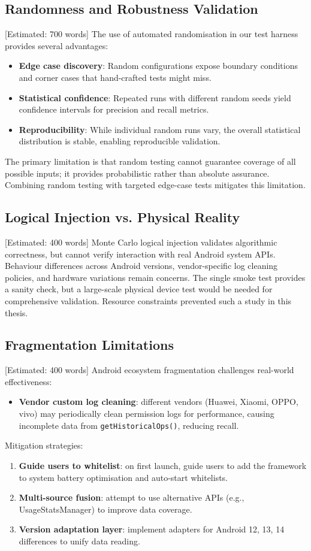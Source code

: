 \subsection{Randomness and Robustness Validation} [Estimated: 700 words]
The use of automated randomisation in our test harness provides several advantages:
\begin{itemize}
\item \textbf{Edge case discovery}: Random configurations expose boundary conditions and corner cases that hand-crafted tests might miss.
\item \textbf{Statistical confidence}: Repeated runs with different random seeds yield confidence intervals for precision and recall metrics.
\item \textbf{Reproducibility}: While individual random runs vary, the overall statistical distribution is stable, enabling reproducible validation.
\end{itemize}

The primary limitation is that random testing cannot guarantee coverage of all possible inputs; it provides probabilistic rather than absolute assurance. Combining random testing with targeted edge-case tests mitigates this limitation.

\subsection{Logical Injection vs. Physical Reality} [Estimated: 400 words]
Monte Carlo logical injection validates algorithmic correctness, but cannot verify interaction with real Android system APIs. Behaviour differences across Android versions, vendor-specific log cleaning policies, and hardware variations remain concerns. The single smoke test provides a sanity check, but a large-scale physical device test would be needed for comprehensive validation. Resource constraints prevented such a study in this thesis.

\subsection{Fragmentation Limitations} [Estimated: 400 words]
Android ecosystem fragmentation challenges real-world effectiveness:
\begin{itemize}
\item \textbf{Vendor custom log cleaning}: different vendors (Huawei, Xiaomi, OPPO, vivo) may periodically clean permission logs for performance, causing incomplete data from \texttt{getHistoricalOps()}, reducing recall.
\end{itemize}

Mitigation strategies:
\begin{enumerate}
\item \textbf{Guide users to whitelist}: on first launch, guide users to add the framework to system battery optimisation and auto-start whitelists.
\item \textbf{Multi-source fusion}: attempt to use alternative APIs (e.g., UsageStatsManager) to improve data coverage.
\item \textbf{Version adaptation layer}: implement adapters for Android 12, 13, 14 differences to unify data reading.
\end{enumerate}